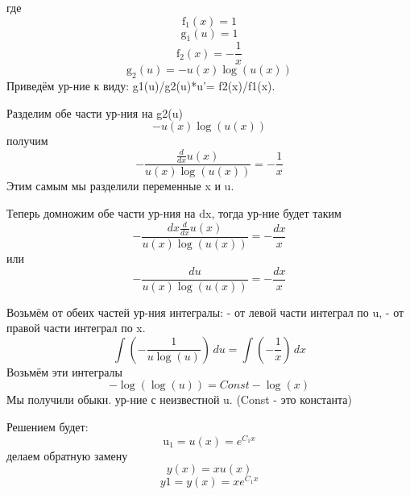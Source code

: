 \documentclass[oneside,final,14pt]{extreport}
\begin{document}
где
$$\operatorname{f_{1}}{\left(x \right)} = 1$$
$$\operatorname{g_{1}}{\left(u \right)} = 1$$
$$\operatorname{f_{2}}{\left(x \right)} = - \frac{1}{x}$$
$$\operatorname{g_{2}}{\left(u \right)} = - u{\left(x \right)} \log{\left(u{\left(x \right)} \right)}$$
Приведём ур-ние к виду:
g1(u)/g2(u)*u'= f2(x)/f1(x).

Разделим обе части ур-ния на g2(u)
$$- u{\left(x \right)} \log{\left(u{\left(x \right)} \right)}$$
получим
$$- \frac{\frac{d}{d x} u{\left(x \right)}}{u{\left(x \right)} \log{\left(u{\left(x \right)} \right)}} = - \frac{1}{x}$$
Этим самым мы разделили переменные x и u.

Теперь домножим обе части ур-ния на dx,
тогда ур-ние будет таким
$$- \frac{dx \frac{d}{d x} u{\left(x \right)}}{u{\left(x \right)} \log{\left(u{\left(x \right)} \right)}} = - \frac{dx}{x}$$
или
$$- \frac{du}{u{\left(x \right)} \log{\left(u{\left(x \right)} \right)}} = - \frac{dx}{x}$$

Возьмём от обеих частей ур-ния интегралы:
- от левой части интеграл по u,
- от правой части интеграл по x.
$$\int \left(- \frac{1}{u \log{\left(u \right)}}\right)\, du = \int \left(- \frac{1}{x}\right)\, dx$$
Возьмём эти интегралы
$$- \log{\left(\log{\left(u \right)} \right)} = Const - \log{\left(x \right)}$$
Мы получили обыкн. ур-ние с неизвестной u.
(Const - это константа)

Решением будет:
$$\operatorname{u_{1}} = u{\left(x \right)} = e^{C_{1} x}$$
делаем обратную замену
$$y{\left(x \right)} = x u{\left(x \right)}$$
$$y1 = y(x) = x e^{C_{1} x}$$
\end{document}

